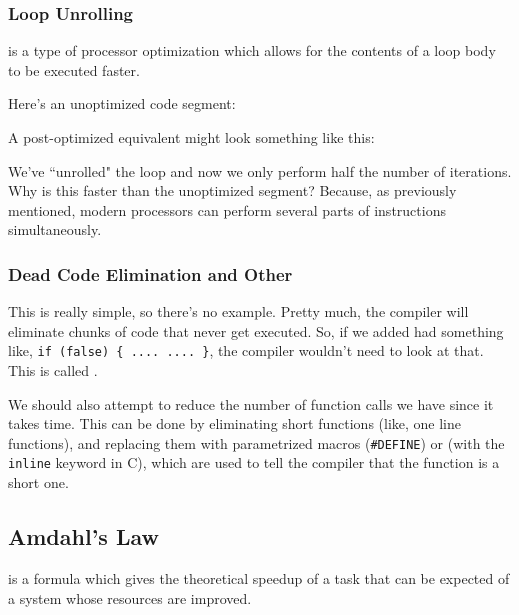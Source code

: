 \subsubsection{Loop Unrolling}
 is a type of processor optimization which allows for the contents of a loop body to be executed faster.

Here's an unoptimized code segment:

\lstset{
caption=Unoptimized Compiler Code
}
\begin{center}

\end{center}

A post-optimized equivalent might look something like this:

\lstset{
caption=Optimized Compiler Code
}
\begin{center}

\end{center}

We've ``unrolled" the loop and now we only perform half the number of iterations. Why is this faster than the unoptimized segment? Because, as previously mentioned, modern processors can perform several parts of instructions simultaneously. 

\subsubsection{Dead Code Elimination and Other}

This is really simple, so there's no example. Pretty much, the compiler will eliminate chunks of code that never get executed. So, if we added had something like, \verb!if (false) { .... .... }!, the compiler wouldn't need to look at that. This is called .


We should also attempt to reduce the number of function calls we have since it takes time. This can be done by eliminating short functions (like, one line functions), and replacing them with parametrized macros (\verb!#DEFINE!) or  (with the \verb!inline! keyword in C), which are used to tell the compiler that the function is a short one.



\subsection{Amdahl's Law}

 is a formula which gives the theoretical speedup of a task that can be expected of a system whose resources are improved. 

